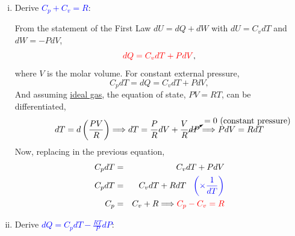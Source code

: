\documentclass[12pts,a4paper,amsmath,amssymb,floatfix]{article}%
\newcommand{\frc}{\displaystyle\frac}
\newcommand{\red}{\textcolor{red}}
\newcommand{\blue}{\textcolor{blue}}
\begin{document}
   \begin{enumerate}[i)]
%
      \item Derive \blue{$C_{p}+C_{v}=R$}:

           From the statement of the First Law $dU = dQ + dW$ with $dU=C_{v}dT$ and $dW = -PdV$,
              \begin{equation}
                  \red{dQ = C_{v}dT + PdV},\label{Mod01_1Law_1}
              \end{equation}
           where $V$ is the molar volume. For constant external pressure,
              \begin{displaymath}
                  C_{p}dT = dQ = C_{v}dT + PdV,
              \end{displaymath}
           And assuming \underline{ideal gas}, the equation of state, $PV=RT$, can be differentiated,
              \begin{displaymath}
                  dT = d\left(\frc{P V}{R}\right) \Longrightarrow dT =\frc{P}{R}dV + \frc{V}{R}\cancelto{=0\text{ (constant pressure)}}{dP}  \Longrightarrow PdV = RdT
              \end{displaymath}
           Now, replacing in the previous equation,
              \begin{eqnarray}
                  C_{p}dT &=& C_{v}dT + PdV \nonumber \\
                  C_{p}dT &=& C_{v}dT + RdT \;\;\;\blue{\left(\times \frc{1}{dT}\right)} \nonumber\\
                  C_{p} &=& C_{v} + R \Longrightarrow \red{C_{p}-C_{v}=R}  \label{Mod01_1Law_CpCv}
              \end{eqnarray}
%
      \item Derive \blue{$dQ=C_{p}dT-\frc{RT}{P}dP$}:


\end{enumerate}
\end{document}
